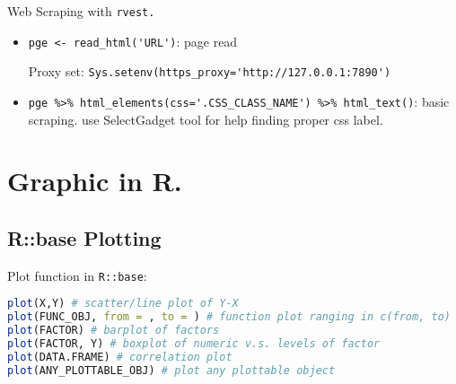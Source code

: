 \begin{point}
    Web Scraping with \lstinline|rvest.|
\end{point}

\begin{itemize}[topsep=2pt,itemsep=0pt]
    \item \lstinline|pge <- read_html('URL')|: page read
    
    Proxy set: \lstinline|Sys.setenv(https_proxy='http://127.0.0.1:7890')|
    \item \lstinline|pge %>% html_elements(css='.CSS_CLASS_NAME') %>% html_text()|: basic scraping. use SelectGadget tool for help finding proper css label.
\end{itemize}




\section{Graphic in R.}

\subsection{R::base Plotting}

    Plot function in \lstinline|R::base|:
\begin{lstlisting}[language=R]
plot(X,Y) # scatter/line plot of Y-X
plot(FUNC_OBJ, from = , to = ) # function plot ranging in c(from, to)
plot(FACTOR) # barplot of factors
plot(FACTOR, Y) # boxplot of numeric v.s. levels of factor
plot(DATA.FRAME) # correlation plot
plot(ANY_PLOTTABLE_OBJ) # plot any plottable object 
\end{lstlisting}

